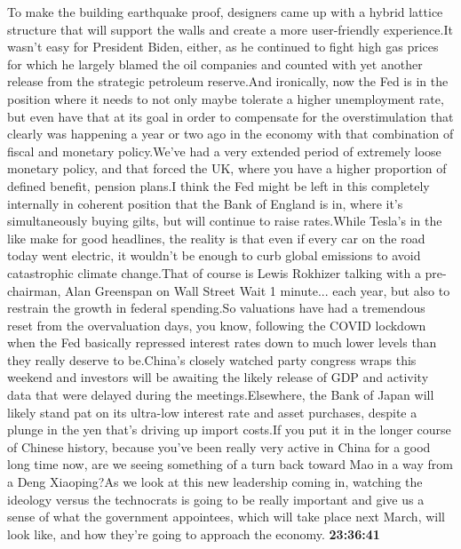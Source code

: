 \documentclass{article}%
\begin{document}
To make the building earthquake proof, designers came up with a hybrid lattice structure that will support the walls and create a more user{-}friendly experience.It wasn't easy for President Biden, either, as he continued to fight high gas prices for which he largely blamed the oil companies and counted with yet another release from the strategic petroleum reserve.And ironically, now the Fed is in the position where it needs to not only maybe tolerate a higher unemployment rate, but even have that at its goal in order to compensate for the overstimulation that clearly was happening a year or two ago in the economy with that combination of fiscal and monetary policy.We've had a very extended period of extremely loose monetary policy, and that forced the UK, where you have a higher proportion of defined benefit, pension plans.I think the Fed might be left in this completely internally in coherent position that the Bank of England is in, where it's simultaneously buying gilts, but will continue to raise rates.While Tesla's in the like make for good headlines, the reality is that even if every car on the road today went electric, it wouldn't be enough to curb global emissions to avoid catastrophic climate change.That of course is Lewis Rokhizer talking with a pre{-}chairman, Alan Greenspan on Wall Street Wait 1 minute...  each year, but also to restrain the growth in federal spending.So valuations have had a tremendous reset from the overvaluation days, you know, following the COVID lockdown when the Fed basically repressed interest rates down to much lower levels than they really deserve to be.China's closely watched party congress wraps this weekend and investors will be awaiting the likely release of GDP and activity data that were delayed during the meetings.Elsewhere, the Bank of Japan will likely stand pat on its ultra{-}low interest rate and asset purchases, despite a plunge in the yen that's driving up import costs.If you put it in the longer course of Chinese history, because you've been really very active in China for a good long time now, are we seeing something of a turn back toward Mao in a way from a Deng Xiaoping?As we look at this new leadership coming in, watching the ideology versus the technocrats is going to be really important and give us a sense of what the government appointees, which will take place next March, will look like, and how they're going to approach the economy.%
\textbf{23:36:41}%
\end{document}
